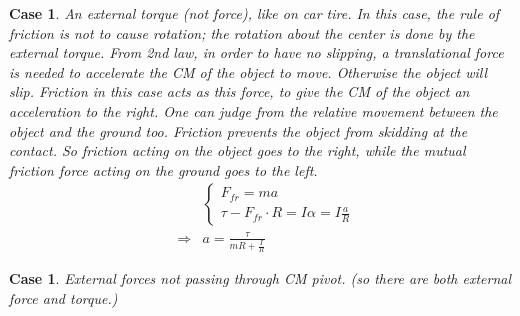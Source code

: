 \documentclass{article}
\newtheorem{case}[theorem]{Case}
\begin{document}
\newpage

\begin{case}
An external torque (not force), like on car tire.\newline
\newline
In this case, the rule of friction is not to cause rotation; the rotation
about the center is done by the external torque. From 2nd law, in order to
have no slipping, a translational force is needed to accelerate the CM of
the object to move. Otherwise the object will slip. Friction in this case
acts as this \emph{force}, to give the CM of the object an acceleration to
the right. One can judge from the relative movement between the object and
the ground too. Friction prevents the object from skidding at the contact.
So friction acting on the object goes to the right, while the mutual
friction force acting on the ground goes to the left.%
\begin{eqnarray*}
&&\left\{ 
\begin{array}{c}
F_{fr}=ma \\ 
\tau -F_{fr}\cdot R=I\alpha =I\frac{a}{R}%
\end{array}%
\right. \\
&\Rightarrow &a=\frac{\tau }{mR+\frac{I}{R}}
\end{eqnarray*}%

\end{case}

\newpage

\begin{case}
External forces not passing through CM pivot. (so there are both external
force and torque.)
\end{case}



\bigskip
\end{document}
